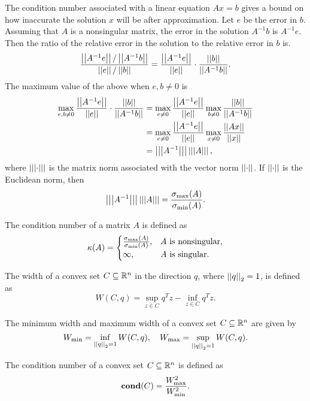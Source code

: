 \documentclass[12pt]{article}
\begin{document}
The condition number associated with a linear equation \(Ax=b\) gives a bound on how inaccurate the solution \(x\) will be after approximation. Let \(e\) be the error in \(b\). Assuming that \(A\) is a nonsingular matrix, the error in the solution \(A^{-1}b\) is \(A^{-1}e\). Then the ratio of the relative error in the solution to the relative error in \(b\) is.
\[\frac{\left|\left|A^{-1}e\right|\right|/\left|\left|A^{-1}b\right|\right|}{\left|\left|e\right|\right|/\left|\left|b\right|\right|}=\frac{\left|\left|A^{-1}e\right|\right|}{\left|\left|e\right|\right|}\cdot\frac{\left|\left|b\right|\right|}{\left|\left|A^{-1}b\right|\right|}.\]
The maximum value of the above when \(e,b\neq 0\) is
\[\begin{aligned}
    \max_{e,b\neq 0}\frac{\left|\left|A^{-1}e\right|\right|}{\left|\left|e\right|\right|}\cdot\frac{\left|\left|b\right|\right|}{\left|\left|A^{-1}b\right|\right|}
    &=\max_{e\neq 0}\frac{\left|\left|A^{-1}e\right|\right|}{\left|\left|e\right|\right|}\max_{b\neq 0}\frac{\left|\left|b\right|\right|}{\left|\left|A^{-1}b\right|\right|}\\
    &=\max_{e\neq 0}\frac{\left|\left|A^{-1}e\right|\right|}{\left|\left|e\right|\right|}\max_{x\neq 0}\frac{\left|\left|Ax\right|\right|}{\left|\left|x\right|\right|}\\
    &=\left|\left|\left|A^{-1}\right|\right|\right|\left|\left|\left|A\right|\right|\right|,
\end{aligned}\]
where \(\left|\left|\left|\cdot\right|\right|\right|\) is the matrix norm associated with the vector norm \(\left|\left|\cdot\right|\right|\). If \(\left|\left|\cdot\right|\right|\) is the Euclidean norm, then
\[\left|\left|\left|A^{-1}\right|\right|\right|\left|\left|\left|A\right|\right|\right|=\frac{\sigma_{\max}(A)}{\sigma_{\min}(A)}.\]

\begin{definition}
    The \textnormal{condition number} of a matrix \(A\) is defined as
    \[\kappa(A)=\begin{cases}
        \frac{\sigma_{\max}(A)}{\sigma_{\min}(A)},&A\textnormal{ is nonsingular},\\
        \infty,&A\textnormal{ is singular}.
    \end{cases}\]
\end{definition}

\begin{definition}
    The \textnormal{width} of a convex set \(C\subseteq\mathbb R^n\) in the direction \(q\), where \(\left|\left|q\right|\right|_2=1\), is defined as
    \[W(C,q)=\sup_{z\in C}q^Tz-\inf_{z\in C}q^Tz.\]
\end{definition}

\begin{definition}
    The \textnormal{minimum width} and \textnormal{maximum width} of a convex set \(C\subseteq\mathbb R^n\) are given by
    \[W_{\min}=\inf_{\left|\left|q\right|\right|_2=1}W(C,q),\quad W_{\max}=\sup_{\left|\left|q\right|\right|_2=1}W(C,q).\]
\end{definition}

\begin{definition}
    The \textnormal{condition number} of a convex set \(C\subseteq\mathbb R^n\) is defined as
    \[\operatorname{\mathbf{cond}}(C)=\frac{W_{\max}^2}{W_{\min}^2}.\]
\end{definition}
\end{document}
